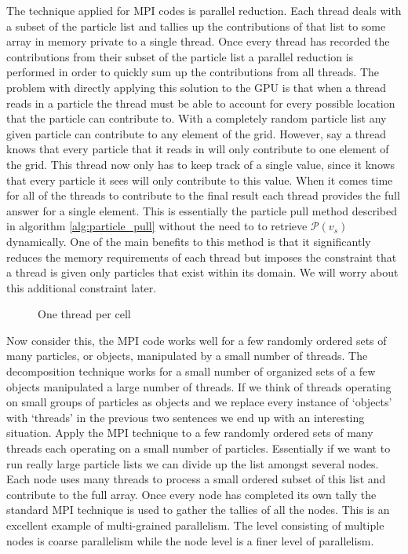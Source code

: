 The technique applied for MPI codes is parallel reduction. Each thread deals with a subset of the particle list and tallies up the contributions of that list to some array in memory private to a single thread. Once every thread has recorded the contributions from their subset of the particle list a parallel reduction is performed in order to quickly sum up the contributions from all threads. The problem with directly applying this solution to the GPU is that when a thread reads in a particle the thread must be able to account for every possible location that the particle can contribute to. With a completely random particle list any given particle can contribute to any element of the grid. However, say a thread knows that every particle that it reads in will only contribute to one element of the grid. This thread now only has to keep track of a single value, since it knows that every particle it sees will only contribute to this value. When it comes time for all of the threads to contribute to the final result each thread provides the full answer for a single element. This is essentially the particle pull method described in algorithm \ref{alg:particle_pull} without the need to to retrieve $\mathcal{P}(v_s)$ dynamically. One of the main benefits to this method is that it significantly reduces the memory requirements of each thread but imposes the constraint that a thread is given only particles that exist within its domain. We will worry about this additional constraint later. 

\begin{figure}
\begin{center}

\end{center}
\caption{One thread per cell}
\label{fig:pic_flowchart_parallel}
\end{figure}

Now consider this, the MPI code works well for a few randomly ordered sets of many particles, or objects, manipulated by a small number of threads. The decomposition technique works for a small number of organized sets of a few objects manipulated a large number of threads. If we think of threads operating on small groups of particles as objects and we replace every instance of `objects' with `threads' in the previous two sentences we end up with an interesting situation. Apply the MPI technique to a few randomly ordered sets of many threads each operating on a small number of particles. Essentially if we want to run really large particle lists we can divide up the list amongst several nodes. Each node uses many threads to process a small ordered subset of this list and contribute to the full array. Once every node has completed its own tally the standard MPI technique is used to gather the tallies of all the nodes. This is an excellent example of multi-grained parallelism. The level consisting of multiple nodes is coarse parallelism while the node level is a finer level of parallelism.   

